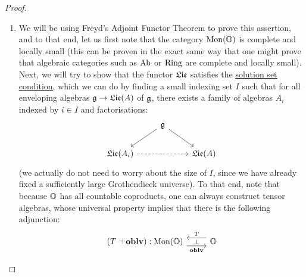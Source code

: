                         \begin{proof}
                            \noindent
                            \begin{enumerate}
                                \item We will be using Freyd's Adjoint Functor Theorem \cite[Theorem V.6.2]{maclane} to prove this assertion, and to that end, let us first note that the category $\mathrm{Mon}(\mathbb{O})$ is complete and locally small (this can be proven in the exact same way that one might prove that algebraic categories such as $\mathrm{Ab}$ or $\mathrm{Ring}$ are complete and locally small). Next, we will try to show that the functor $\mathfrak{Lie}$ satisfies the \href{https://ncatlab.org/nlab/show/solution+set+condition}{\underline{solution set condition}}, which we can do by finding a small indexing set $I$ such that for all enveloping algebras $\mathfrak{g} \to \mathfrak{Lie}(A)$ of $\mathfrak{g}$, there exists a family of algebras $A_i$ indexed by $i \in I$ and factorisations:
                                    $$
                                        \begin{tikzcd}
                                        	& {\g} \\
                                        	{\frakLie(A_i)} && {\frakLie(A)}
                                        	\arrow[from=2-1, to=2-3, dashed]
                                        	\arrow["{}"', from=1-2, to=2-1]
                                        	\arrow["{}", from=1-2, to=2-3]
                                        \end{tikzcd}
                                    $$
                                (we actually do not need to worry about the size of $I$, since we have already fixed a sufficiently large Grothendieck universe). To that end, note that because $\mathbb{O}$ has all countable coproducts, one can always construct tensor algebras, whose universal property implies that there is the following adjunction:
                                    $$
                                        \begin{tikzcd}
                                        	{(T \ladjoint \oblv): \Mon(\O)} & {\O}
                                        	\arrow["{\oblv}"{name=0, swap}, from=1-1, to=1-2, shift right=2]
                                        	\arrow["{T}"{name=1, swap}, from=1-2, to=1-1, shift right=2]
                                        	\arrow["\dashv"{rotate=-90}, from=1, to=0, phantom]
                                        \end{tikzcd}
                                    $$

\end{enumerate}
\end{proof}
